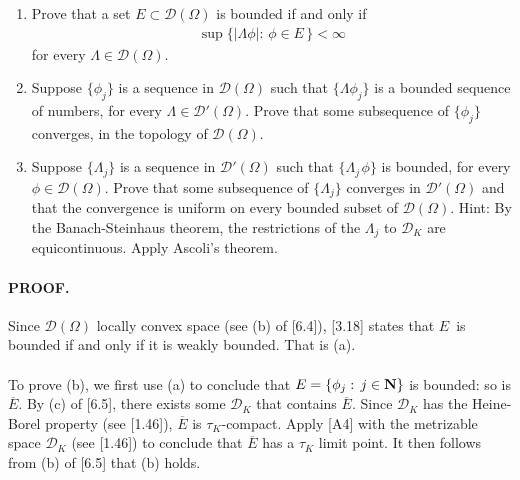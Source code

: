 \renewcommand{\labelenumi}{(\alph{enumi})} 
{\CMUCS 
\begin{enumerate}
\item Prove that a set $E\subset \mathscr{D}(\Omega)$ is bounded if and only if 
\begin{align*}
\sup \{\lvert\Lambda \phi\rvert:\, \phi \in E\,\}< \infty
\end{align*} 
for every $\Lambda \in \mathscr{D}(\Omega)$.
\item Suppose $\{\phi_j\}$ is a sequence in $\mathscr{D}(\Omega)$ such that $\{\Lambda \phi_j\}$ is a bounded sequence of numbers, for every $\Lambda \in \mathscr{D}'(\Omega)$. Prove that some subsequence of $\{\phi_j\}$ converges, in the topology of $\mathscr{D}(\Omega)$.
\item Suppose $\{\Lambda _j\}$ is a sequence in $\mathscr{D}'(\Omega)$ such that $\{\Lambda_{j\,} \phi\}$ is bounded, for every $\phi \in \mathscr{D}(\Omega)$. Prove that some subsequence of $\{\Lambda _j\}$ converges in $\mathscr{D}'(\Omega)$ and that the convergence is uniform on every bounded subset of $\mathscr{D}(\Omega)$. Hint: By the Banach-Steinhaus theorem, the restrictions of the $\Lambda_j$ to $\mathscr{D}_K$ are equicontinuous. Apply Ascoli's theorem.
\end{enumerate}}
\paragraph{PROOF.} 
Since $\mathscr{D}(\Omega)$ locally convex space (see (b) of [6.4]), [3.18] states that $E\,$ is bounded if and only if it is weakly bounded. That is (a). \\
\\
To prove (b), we first use (a) to conclude that $E= \{\phi_j:\, j\in {\mathbf N}\}$ is bounded: so is $\overline{E}$. By (c) of [6.5], there exists some $ \mathscr{D}_K$ that contains $\overline{E}$. Since $ \mathscr{D}_K$ has the Heine-Borel property (see [1.46]), $\overline{E}$ is $\tau_K$-compact. Apply [A4] with the metrizable space $\mathscr{D}_K$ (see [1.46]) to conclude that $\overline{E}$ has a $\tau_K$ limit point. It then follows from (b) of [6.5] that (b) holds.